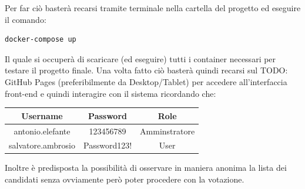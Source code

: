 \documentclass[twoside]{report}
\begin{document}
Per far ciò basterà recarsi tramite terminale nella cartella del progetto ed eseguire il comando:
\begin{listing}[h!]
\begin{verbatim}
docker-compose up
\end{verbatim} 
\end{listing}
\FloatBarrier

\bigbreak

Il quale si occuperà di scaricare (ed eseguire) tutti i container necessari per testare il progetto finale. Una volta fatto ciò basterà quindi recarsi sul TODO: GitHub Pages (preferibilmente da Desktop/Tablet) per accedere all'interfaccia front-end e quindi interagire con il sistema ricordando che:
\begin{table}[h]
\centering
\begin{tabular}{|c|c|c|}
\hline
\textbf{Username} & \textbf{Password} & \textbf{Role} \\ \hline
antonio.elefante    & 123456789 & Amminstratore   \\ \hline
salvatore.ambrosio    & Password123! & User  \\ \hline
\end{tabular}
\end{table}
\FloatBarrier

Inoltre è predisposta la possibilità di osservare in maniera anonima la lista dei candidati senza ovviamente però poter procedere con la votazione.

\bigbreak
\pagestyle{empty} 
\thispagestyle{empty} 
\listoffigures
\thispagestyle{empty} 
\listoftables
\thispagestyle{empty} 
\end{document}
